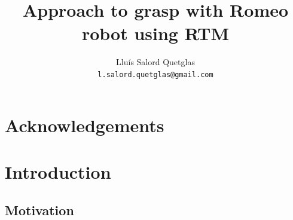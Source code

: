 \documentclass[12pt,a4paper,final,twoside,openright]{report}
\title{Approach to grasp with Romeo robot using RTM}
\author{Lluís Salord Quetglas\\
		\texttt{l.salord.quetglas@gmail.com}\\}
\date{Technischen Universität Wien (TU Wien)\\
Automation and Control Institute (ACIN)\\
\paragraph{} 
Master Thesis Project\\
\paragraph{}
\today} %
\begin{document}
\maketitle
\thispagestyle{empty}

\cleardoublepage


\begin{abstract}

\end{abstract}

\tableofcontents
\newpage
\listoffigures
\newpage
\listoftables
\newpage

\chapter*{Acknowledgements}



\chapter{Introduction}

\section{Motivation}
\end{document}
